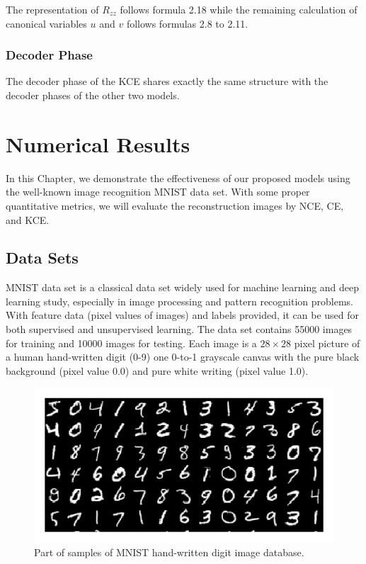 \documentclass[12pt]{report} %
\begin{document}
The representation of $R_{zz}$ follows formula 2.18 while the remaining calculation of canonical variables $u$ and $v$ follows formulas 2.8 to 2.11.

\subsection{Decoder Phase}
The decoder phase of the KCE shares exactly the same structure with the decoder phases of the other two models. 

\chapter{Numerical Results}
In this Chapter, we demonstrate the effectiveness of our proposed models using the well-known image recognition MNIST data set. With some proper quantitative metrics, we will evaluate the reconstruction images by NCE, CE, and KCE. 
\section{Data Sets}
MNIST data set\cite{MNIST} is a classical data set widely used for machine learning and deep learning study, especially in image processing and pattern recognition problems. With feature data (pixel values of images) and labels provided, it can be used for both supervised and unsupervised learning. The data set contains 55000 images for training and 10000 images for testing. Each image is a $28 \times 28$ pixel picture of a human hand-written digit (0-9) one 0-to-1 grayscale canvas with the pure black background (pixel value 0.0) and pure white writing (pixel value 1.0).
\begin{figure}[H]
	\centering
	\includegraphics[scale=2.5]{pictures/MNIST.png}
	\caption{Part of samples of MNIST hand-written digit image database\cite{MNISTPIC}.}
	\label{fig:1}
\end{figure}
\end{document}
